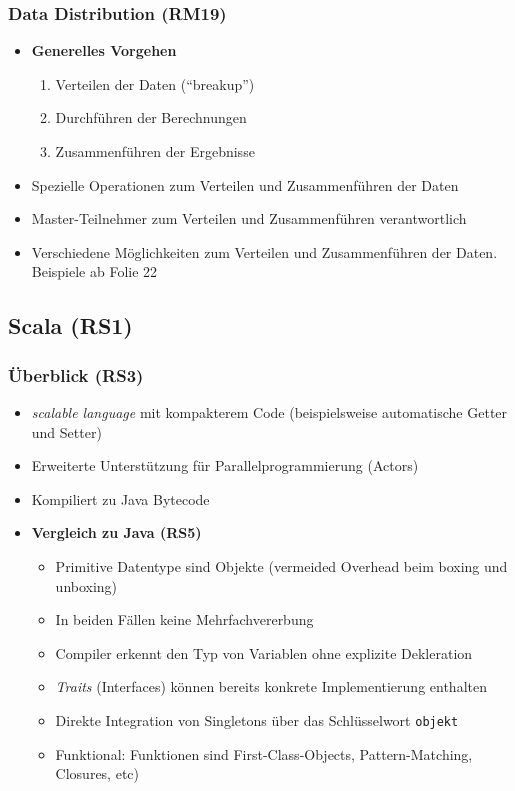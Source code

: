 \subsubsection{Data Distribution (RM19)}
\begin{itemize}
	\item \textbf{Generelles Vorgehen}
	\begin{enumerate}
		\item Verteilen der Daten ("`breakup"')
		\item Durchführen der Berechnungen
		\item Zusammenführen der Ergebnisse
	\end{enumerate}
	\item Spezielle Operationen zum Verteilen und Zusammenführen der Daten
	\item Master-Teilnehmer zum Verteilen und Zusammenführen verantwortlich
	\item Verschiedene Möglichkeiten zum Verteilen und Zusammenführen der Daten. Beispiele ab Folie 22
\end{itemize}


\subsection{Scala (RS1)}

\subsubsection{Überblick (RS3)}
\begin{itemize}
	\item \textit{scalable language} mit kompakterem Code (beispielsweise automatische Getter und Setter)
	\item Erweiterte Unterstützung für Parallelprogrammierung (Actors)
	\item Kompiliert zu Java Bytecode
	\item \textbf{Vergleich zu Java (RS5)}
	\begin{itemize}
		\item Primitive Datentype sind Objekte (vermeided Overhead beim boxing und unboxing)
		\item In beiden Fällen keine Mehrfachvererbung
		\item Compiler erkennt den Typ von Variablen ohne explizite Dekleration
		\item \textit{Traits} (Interfaces) können bereits konkrete Implementierung enthalten
		\item Direkte Integration von Singletons über das Schlüsselwort \texttt{objekt}
		\item Funktional: Funktionen sind First-Class-Objects, Pattern-Matching, Closures, etc)
	\end{itemize}
\end{itemize}

